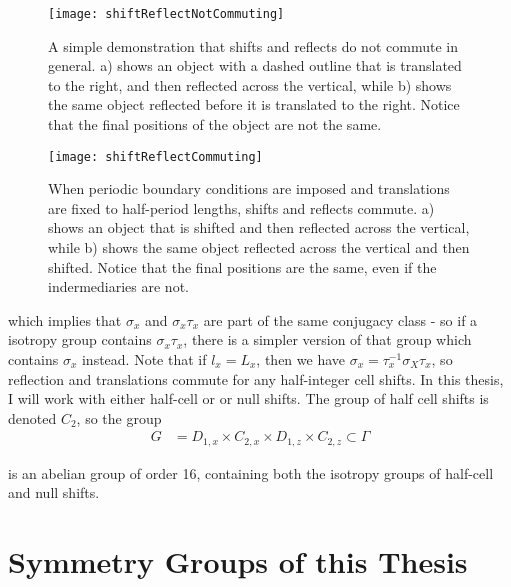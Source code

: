 \begin{figure}[t!]
\texttt{[image: shiftReflectNotCommuting]}
\caption{A simple demonstration that shifts and reflects do not commute in general. a) shows an object with a dashed outline that is translated to the right, and then reflected across the vertical, while b) shows the same object reflected before it is translated to the right. Notice that the final positions of the object are not the same.}\label{fig:notabelian}
\end{figure}

\begin{figure}[t!]
\texttt{[image: shiftReflectCommuting]}
\caption{When periodic boundary conditions are imposed and translations are fixed to half-period lengths, shifts and reflects commute. a) shows an object that is shifted and then reflected across the vertical, while b) shows the same object reflected across the vertical and then shifted. Notice that the final positions are the same, even if the indermediaries are not.}\label{fig:abelian}
\end{figure}
which implies that $\sigma_x$ and $\sigma_x\tau_x$ are part of the same conjugacy class - so if a isotropy group contains $\sigma_x\tau_x$, there is a simpler version of that group which contains $\sigma_x$ instead. Note that if $l_x = L_x$, then we have $\sigma_x = \tau_x^{-1}\sigma_X\tau_x$, so reflection and translations commute for any half-integer cell shifts. In this thesis, I will work with either half-cell or or null shifts. The group of half cell shifts is denoted $C_2$, so the group 
\begin{align}
G &= D_{1,x} \times C_{2,x} \times D_{1,z} \times C_{2,z} \subset \Gamma
\end{align} 

is an abelian group of order 16, containing both the isotropy groups of half-cell and null shifts.

\section{Symmetry Groups of this Thesis}


